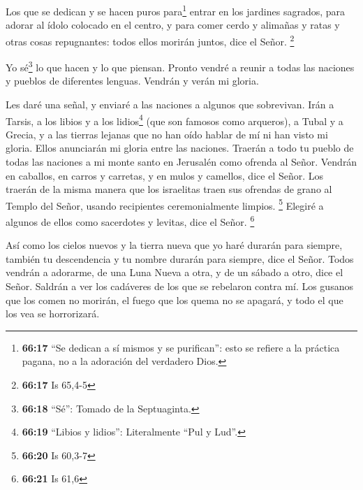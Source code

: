  Los que se dedican y se hacen puros para\footnote{\textbf{66:17}
  ``Se dedican a sí mismos y se purifican'': esto se refiere a la
  práctica pagana, no a la adoración del verdadero Dios.} entrar en los
jardines sagrados, para adorar al ídolo colocado en el centro, y para
comer cerdo y alimañas y ratas y otras cosas repugnantes: todos ellos
morirán juntos, dice el Señor. \footnote{\textbf{66:17} Is 65,4-5}

 Yo sé\footnote{\textbf{66:18} ``Sé'': Tomado de la
  Septuaginta.} lo que hacen y lo que piensan. Pronto vendré a reunir a
todas las naciones y pueblos de diferentes lenguas. Vendrán y verán mi
gloria.

 Les daré una señal, y enviaré a las naciones a algunos
que sobrevivan. Irán a Tarsis, a los libios y a los lidios\footnote{\textbf{66:19}
  ``Libios y lidios'': Literalmente ``Pul y Lud''.} (que son famosos
como arqueros), a Tubal y a Grecia, y a las tierras lejanas que no han
oído hablar de mí ni han visto mi gloria. Ellos anunciarán mi gloria
entre las naciones.  Traerán a todo tu pueblo de todas
las naciones a mi monte santo en Jerusalén como ofrenda al Señor.
Vendrán en caballos, en carros y carretas, y en mulos y camellos, dice
el Señor. Los traerán de la misma manera que los israelitas traen sus
ofrendas de grano al Templo del Señor, usando recipientes
ceremonialmente limpios. \footnote{\textbf{66:20} Is 60,3-7}
 Elegiré a algunos de ellos como sacerdotes y levitas,
dice el Señor. \footnote{\textbf{66:21} Is 61,6}

 Así como los cielos nuevos y la tierra nueva que yo haré
durarán para siempre, también tu descendencia y tu nombre durarán para
siempre, dice el Señor.  Todos vendrán a adorarme, de una
Luna Nueva a otra, y de un sábado a otro, dice el Señor. 
Saldrán a ver los cadáveres de los que se rebelaron contra mí. Los
gusanos que los comen no morirán, el fuego que los quema no se apagará,
y todo el que los vea se horrorizará.
